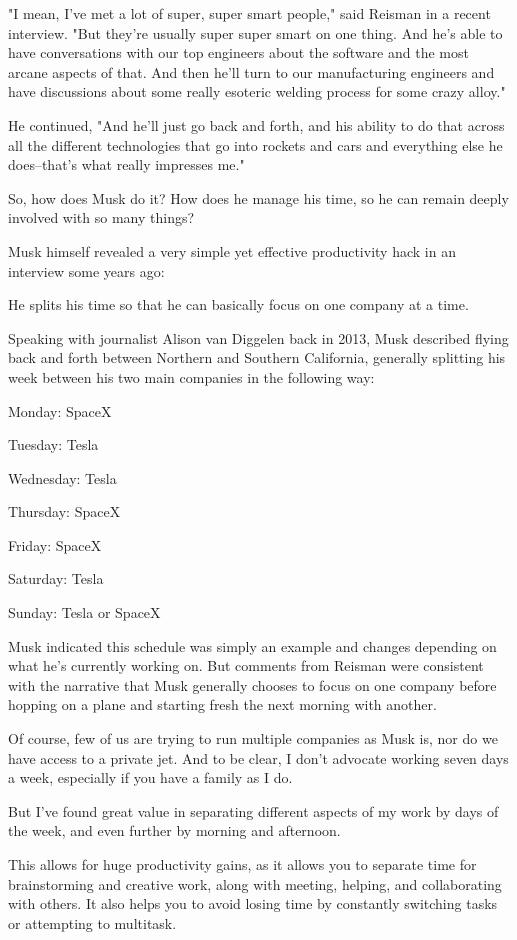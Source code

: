 "I mean, I've met a lot of super, super smart people," said Reisman in a recent interview. "But they're usually super super smart on one thing. And he's able to have conversations with our top engineers about the software and the most arcane aspects of that. And then he'll turn to our manufacturing engineers and have discussions about some really esoteric welding process for some crazy alloy."

He continued, "And he'll just go back and forth, and his ability to do that across all the different technologies that go into rockets and cars and everything else he does--that's what really impresses me."

So, how does Musk do it? How does he manage his time, so he can remain deeply involved with so many things?

Musk himself revealed a very simple yet effective productivity hack in an interview some years ago:

He splits his time so that he can basically focus on one company at a time.

Speaking with journalist Alison van Diggelen back in 2013, Musk described flying back and forth between Northern and Southern California, generally splitting his week between his two main companies in the following way:

Monday: SpaceX

Tuesday: Tesla

Wednesday: Tesla

Thursday: SpaceX

Friday: SpaceX

Saturday: Tesla

Sunday: Tesla or SpaceX

Musk indicated this schedule was simply an example and changes depending on what he's currently working on. But comments from Reisman were consistent with the narrative that Musk generally chooses to focus on one company before hopping on a plane and starting fresh the next morning with another.

Of course, few of us are trying to run multiple companies as Musk is, nor do we have access to a private jet. And to be clear, I don't advocate working seven days a week, especially if you have a family as I do. 

But I've found great value in separating different aspects of my work by days of the week, and even further by morning and afternoon.

This allows for huge productivity gains, as it allows you to separate time for brainstorming and creative work, along with meeting, helping, and collaborating with others. It also helps you to avoid losing time by constantly switching tasks or attempting to multitask.

